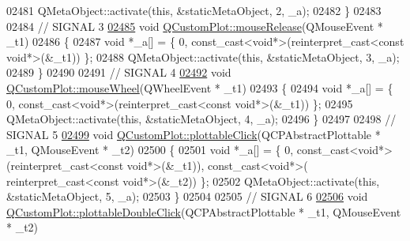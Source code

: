 \begin{DoxyCode}
02481     QMetaObject::activate(\textcolor{keyword}{this}, &staticMetaObject, 2, \_a);
02482 \}
02483 
02484 \textcolor{comment}{// SIGNAL 3}
\hypertarget{a00067_source_l02485}{}\hyperlink{a00116_ac8dc0ee6bb98e923c00b4ebafbe6134d}{02485} \textcolor{keywordtype}{void} \hyperlink{a00116_ac8dc0ee6bb98e923c00b4ebafbe6134d}{QCustomPlot::mouseRelease}(QMouseEvent * \_t1)
02486 \{
02487     \textcolor{keywordtype}{void} *\_a[] = \{ 0, \textcolor{keyword}{const\_cast<}\textcolor{keywordtype}{void}*\textcolor{keyword}{>}(\textcolor{keyword}{reinterpret\_cast<}\textcolor{keyword}{const }\textcolor{keywordtype}{void}*\textcolor{keyword}{>}(&\_t1)) \};
02488     QMetaObject::activate(\textcolor{keyword}{this}, &staticMetaObject, 3, \_a);
02489 \}
02490 
02491 \textcolor{comment}{// SIGNAL 4}
\hypertarget{a00067_source_l02492}{}\hyperlink{a00116_ac80a14206f99304a91d2aa55775ec3ff}{02492} \textcolor{keywordtype}{void} \hyperlink{a00116_ac80a14206f99304a91d2aa55775ec3ff}{QCustomPlot::mouseWheel}(QWheelEvent * \_t1)
02493 \{
02494     \textcolor{keywordtype}{void} *\_a[] = \{ 0, \textcolor{keyword}{const\_cast<}\textcolor{keywordtype}{void}*\textcolor{keyword}{>}(\textcolor{keyword}{reinterpret\_cast<}\textcolor{keyword}{const }\textcolor{keywordtype}{void}*\textcolor{keyword}{>}(&\_t1)) \};
02495     QMetaObject::activate(\textcolor{keyword}{this}, &staticMetaObject, 4, \_a);
02496 \}
02497 
02498 \textcolor{comment}{// SIGNAL 5}
\hypertarget{a00067_source_l02499}{}\hyperlink{a00116_a57e5efa8a854620e9bf62d31fc139f53}{02499} \textcolor{keywordtype}{void} \hyperlink{a00116_a57e5efa8a854620e9bf62d31fc139f53}{QCustomPlot::plottableClick}(QCPAbstractPlottable * \_t1, QMouseEvent * \_t2)
02500 \{
02501     \textcolor{keywordtype}{void} *\_a[] = \{ 0, \textcolor{keyword}{const\_cast<}\textcolor{keywordtype}{void}*\textcolor{keyword}{>}(\textcolor{keyword}{reinterpret\_cast<}\textcolor{keyword}{const }\textcolor{keywordtype}{void}*\textcolor{keyword}{>}(&\_t1)), \textcolor{keyword}{const\_cast<}\textcolor{keywordtype}{void}*\textcolor{keyword}{>}(\textcolor{keyword}{
      reinterpret\_cast<}\textcolor{keyword}{const }\textcolor{keywordtype}{void}*\textcolor{keyword}{>}(&\_t2)) \};
02502     QMetaObject::activate(\textcolor{keyword}{this}, &staticMetaObject, 5, \_a);
02503 \}
02504 
02505 \textcolor{comment}{// SIGNAL 6}
\hypertarget{a00067_source_l02506}{}\hyperlink{a00116_af2e6f1cea923dae437681d01ce7d0c31}{02506} \textcolor{keywordtype}{void} \hyperlink{a00116_af2e6f1cea923dae437681d01ce7d0c31}{QCustomPlot::plottableDoubleClick}(QCPAbstractPlottable * \_t1, 
      QMouseEvent * \_t2)

\end{DoxyCode}
